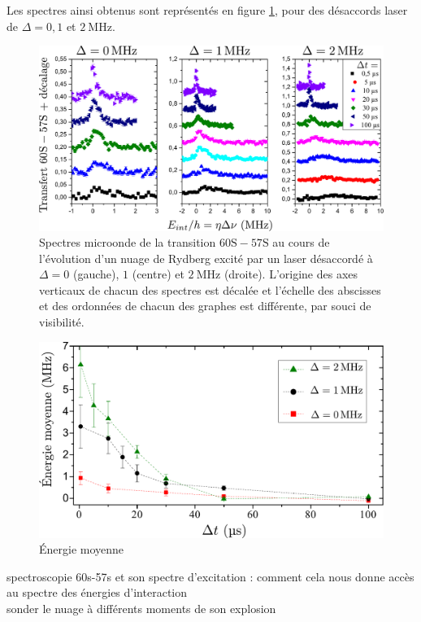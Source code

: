 Les spectres ainsi obtenus sont représentés en figure \ref{fig:microwave_explosion}, pour des désaccords laser de $\Delta = 0, 1$ et $\SI{2}{\MHz}$.
%
\begin{figure}[!h]
\centering
\includegraphics[width=\linewidth]{figures/low_l/expansion_012MHz}
\caption[Spectroscopie microonde de l'expansion du nuage]{
Spectres microonde de la transition $\mathrm{60S-57S}$ au cours de l'évolution d'un nuage de Rydberg excité par un laser désaccordé à $\Delta= 0$ (gauche), $1$ (centre) et $\SI{2}{\MHz}$ (droite).
L'origine des axes verticaux de chacun des spectres est décalée et l'échelle des abscisses et des ordonnées de chacun des graphes est différente, par souci de visibilité.
}
\label{fig:microwave_explosion}
\end{figure}
%
%
\begin{figure}[!h]
\centering
\includegraphics[width=\linewidth]{figures/low_l/energie_moyenne_explosion}
\caption[Énergie moyenne]{
Énergie moyenne
}
\label{fig:avener_explosion}
\end{figure}
%

\newpage
	
		\noindent spectroscopie 60s-57s et son spectre d'excitation : comment cela nous donne accès au spectre des énergies d'interaction\\
		sonder le nuage à différents moments de son explosion

